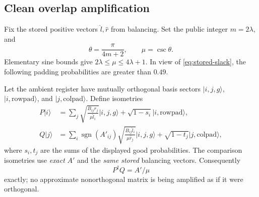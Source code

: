 \documentclass[11pt]{article}
\theoremstyle{definition}
\newcommand{\ket}[1]{\lvert #1\rangle}
\newcommand{\sgn}{\operatorname{sgn}}
\begin{document}
\subsection{Clean overlap amplification}

Fix the stored positive vectors $\widehat l,\widehat r$ from balancing.
Set the public integer $m=2\lambda$, and
\[
 \theta=\frac{\pi}{4m+2},\qquad \mu=\csc\theta.
\]
Elementary sine bounds give $2\lambda\le\mu\le4\lambda+1$.
In view of \eqref{eq:stored-slack}, the following padding probabilities
are greater than $0.49$.

Let the ambient register have mutually orthogonal basis sectors
$\ket{i,j,g}$, $\ket{i,\mathrm{rowpad}}$, and
$\ket{j,\mathrm{colpad}}$. Define isometries
\begin{align}
 P\ket i&=\sum_j\sqrt{\frac{B_{ij}\widehat r_j}{\mu\widehat l_i}}
     \ket{i,j,g}+\sqrt{1-s_i}\ket{i,\mathrm{rowpad}},\label{eq:P}\\
 Q\ket j&=\sum_i\sgn(A'_{ij})
   \sqrt{\frac{B_{ij}\widehat l_i}{\mu\widehat r_j}}
     \ket{i,j,g}+\sqrt{1-t_j}\ket{j,\mathrm{colpad}},\label{eq:Q}
\end{align}
where $s_i,t_j$ are the sums of the displayed good probabilities.
The comparison isometries use \emph{exact} $A'$ and the \emph{same stored}
balancing vectors. Consequently
\begin{equation}\label{eq:overlap}
 P^\dagger Q=A'/\mu
\end{equation}
exactly; no approximate nonorthogonal matrix is being amplified as if it
were orthogonal.
\end{document}
